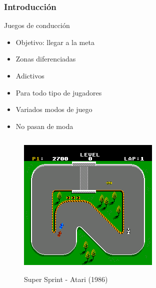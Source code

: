 \begin{frame}
    \frametitle{Introducción}

        \begin{block}{Juegos de conducción}
            \begin{itemize}
                \item Objetivo: llegar a la meta
                \item Zonas diferenciadas
                \item Adictivos
                \item Para todo tipo de jugadores
                \item Variados modos de juego
                \item No pasan de moda
            \end{itemize}
        \end{block}

    \begin{columns}
    
        \column{150px}

        \begin{figure}
          \label{logo_latex}
          \begin{center}
            \includegraphics[scale=0.4]{imagenes/super_sprint.png}
          \end{center}
          Super Sprint - Atari (1986)
        \end{figure}
    

\end{columns}
\end{frame}
